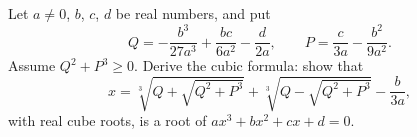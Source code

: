 Let $a\ne0$, $b$, $c$, $d$ be real numbers, and put
\[Q=-\dfrac{b^3}{27a^3}+\dfrac{bc}{6a^2}-\dfrac{d}{2a},\qquad P=\dfrac{c}{3a}-\dfrac{b^2}{9a^2}.\]
Assume $Q^2+P^3\ge0$. Derive the cubic formula: show that
\[x=\sqrt[3]{Q+\sqrt{Q^2+P^3}}+\sqrt[3]{Q-\sqrt{Q^2+P^3}}-\dfrac{b}{3a},\]
with real cube roots, is a root of $ax^3+bx^2+cx+d=0$.
